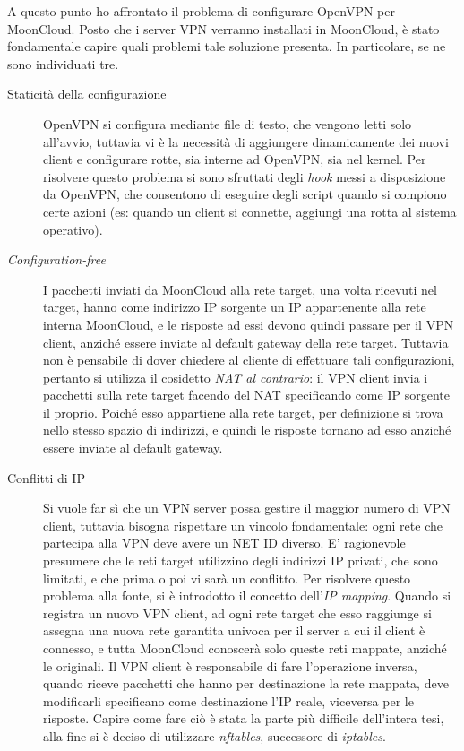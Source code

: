 \documentclass[10pt,a4paper]{article}
\begin{document}
        A questo punto ho affrontato il problema di configurare OpenVPN per
        MoonCloud. Posto che i server VPN verranno installati in MoonCloud, è stato
        fondamentale capire quali problemi tale soluzione
        presenta. In particolare, se ne sono individuati tre.
        \begin{description}
            \item[Staticità della configurazione]OpenVPN si configura mediante
            file di testo, che vengono letti solo all'avvio, tuttavia vi è la necessità
            di aggiungere dinamicamente dei nuovi client e configurare
            rotte, sia interne ad OpenVPN, sia nel kernel.
            Per risolvere questo problema
            si sono sfruttati degli \textit{hook} messi a disposizione da OpenVPN, che
            consentono di eseguire degli script quando si compiono certe azioni
            (es: quando un client si connette, aggiungi una rotta al sistema operativo).
            \item[\textit{Configuration-free}]I pacchetti inviati da MoonCloud alla rete
            target, una volta ricevuti nel target, hanno come indirizzo IP sorgente un IP appartenente
            alla rete interna MoonCloud, e le risposte ad essi devono quindi passare
            per il VPN client, anziché essere inviate al default gateway della rete target.
            Tuttavia non è pensabile di dover chiedere al cliente di effettuare tali configurazioni,
            pertanto si utilizza il cosidetto \textit{NAT al contrario}: il VPN
            client invia i pacchetti sulla rete target facendo del NAT specificando come IP sorgente
            il proprio. Poiché esso appartiene alla rete target, per definizione si trova
            nello stesso spazio di indirizzi, e quindi le risposte tornano ad esso anziché essere
            inviate al default gateway.
            \item[Conflitti di IP]Si vuole far sì che un VPN server possa gestire il maggior numero
            di VPN client, tuttavia bisogna rispettare un vincolo fondamentale: ogni rete che
            partecipa alla VPN deve avere un NET ID diverso. E' ragionevole presumere che
            le reti target utilizzino degli indirizzi IP privati, che sono limitati, e che prima
            o poi vi sarà un conflitto. Per risolvere questo problema alla fonte, si è introdotto
            il concetto dell'\textit{IP mapping}. Quando si registra un nuovo VPN client, ad ogni
            rete target che esso raggiunge si assegna una nuova rete garantita univoca per
            il server a cui il client è connesso, e tutta MoonCloud conoscerà solo queste
            reti mappate, anziché le originali.
            Il VPN client è responsabile di fare l'operazione inversa, quando riceve pacchetti
            che hanno per destinazione la rete mappata, deve modificarli specificano come
            destinazione l'IP reale, viceversa per le risposte.
            Capire come fare ciò è stata la parte più difficile dell'intera tesi, alla fine
            si è deciso di utilizzare \textit{nftables}, successore di \textit{iptables}.
        \end{description}
\end{document}
